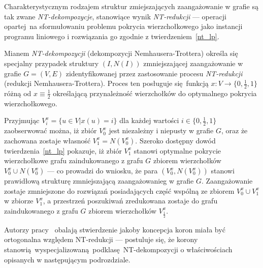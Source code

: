 {  Charakterystycznym rodzajem struktur zmiejszających zaangażowanie w grafie są tak zwane \emph{NT-dekompozycje}, stanowiące wynik \emph{NT-redukcji} --- operacji opartej na sformułowaniu problemu pokrycia wierzchołkowego jako instancji programu liniowego i rozwiązania go zgodnie z twierdzeniem~\ref{nt_lp}.
  \begin{definition}
    Mianem \emph{NT-dekompozycji} (dekompozycji Nemhausera-Trottera) określa się specjalny przypadek struktury $(I, N(I))$ zmniejszającej zaangażowanie w grafie $G=(V, E)$ zidentyfikowanej przez zastosowanie procesu \emph{NT-redukcji} (redukcji Nemhausera-Trottera).
    Proces ten posługuje się funkcją $x: V \rightarrow \{0, \frac{1}{2}, 1\}$ różną od $x \equiv \frac{1}{2}$ określającą przynależność wierzchołków do optymalnego pokrycia wierzchołkowego.
  \end{definition}
  Przyjmując $V_i^x=\{u \in V| x(u)=i\}$ dla każdej wartości $i\in \{0, \frac{1}{2}, 1\}$ zaobserwować można, iż zbiór $V_0^x$ jest niezależny i niepusty w grafie $G$, oraz że zachowana zostaje własność $V_1^x = N(V_0^x)$.
  Szeroko dostępny dowód twierdzenia~\ref{nt_lp} pokazuje, iż zbiór $V_1^x$ stanowi optymalne pokrycie wierzchołkowe grafu zaindukowanego z grafu $G$ zbiorem wierzchołków $V_0^x \cup N(V_0^x)$ --- co prowadzi do wniosku, że para $(V_0^x, N(V_0^x))$ stanowi prawidłową strukturę zmniejszającą zaangażowanieg w grafie $G$.
  Zaangażowanie zostaje zmniejszone do rozwiązań posiadających część wspólną ze zbiorem $V_0^x \cup V_1^x$ w zbiorze $V_1^x$, a przestrzeń poszukiwań zredukowana zostaje do grafu zaindukowanego z grafu $G$ zbiorem wierzchołków $V_\frac{1}{2}^x$.
}
\par{
  Autorzy pracy~\cite{chlebik:crown} obalają stwierdzenie jakoby koncepcja koron miała być ortogonalna względem NT-redukcji --- postuluje się, że korony stanowią wyspecjalizowaną podklasę NT-dekompozycji o właściwościach opisanych w następującym podrozdziale.
}
